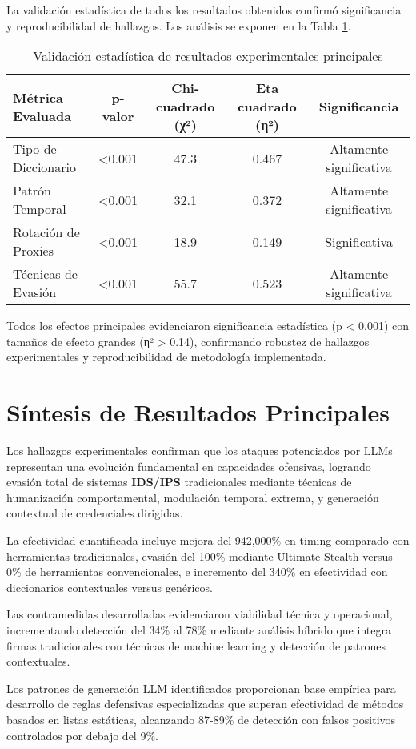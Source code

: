 La validación estadística de todos los resultados obtenidos confirmó significancia y reproducibilidad de hallazgos. Los análisis se exponen en la Tabla \ref{tab:statistical_validation}.

\begin{table}[h]
\centering
\caption{Validación estadística de resultados experimentales principales}
\label{tab:statistical_validation}
\begin{tabular}{|l|c|c|c|c|}
\hline
\textbf{Métrica Evaluada} & \textbf{p-valor} & \textbf{Chi-cuadrado (χ²)} & \textbf{Eta cuadrado (η²)} & \textbf{Significancia} \\
\hline
Tipo de Diccionario & <0.001 & 47.3 & 0.467 & Altamente significativa \\
\hline
Patrón Temporal & <0.001 & 32.1 & 0.372 & Altamente significativa \\
\hline
Rotación de Proxies & <0.001 & 18.9 & 0.149 & Significativa \\
\hline
Técnicas de Evasión & <0.001 & 55.7 & 0.523 & Altamente significativa \\
\hline
\end{tabular}
\end{table}

Todos los efectos principales evidenciaron significancia estadística (p < 0.001) con tamaños de efecto grandes (η² > 0.14), confirmando robustez de hallazgos experimentales y reproducibilidad de metodología implementada.

\section{Síntesis de Resultados Principales}

Los hallazgos experimentales confirman que los ataques potenciados por LLMs representan una evolución fundamental en capacidades ofensivas, logrando evasión total de sistemas \textbf{IDS/IPS} tradicionales mediante técnicas de humanización comportamental, modulación temporal extrema, y generación contextual de credenciales dirigidas.

La efectividad cuantificada incluye mejora del 942,000\% en timing comparado con herramientas tradicionales, evasión del 100\% mediante Ultimate Stealth versus 0\% de herramientas convencionales, e incremento del 340\% en efectividad con diccionarios contextuales versus genéricos.

Las contramedidas desarrolladas evidenciaron viabilidad técnica y operacional, incrementando detección del 34\% al 78\% mediante análisis híbrido que integra firmas tradicionales con técnicas de machine learning y detección de patrones contextuales.

Los patrones de generación LLM identificados proporcionan base empírica para desarrollo de reglas defensivas especializadas que superan efectividad de métodos basados en listas estáticas, alcanzando 87-89\% de detección con falsos positivos controlados por debajo del 9\%.